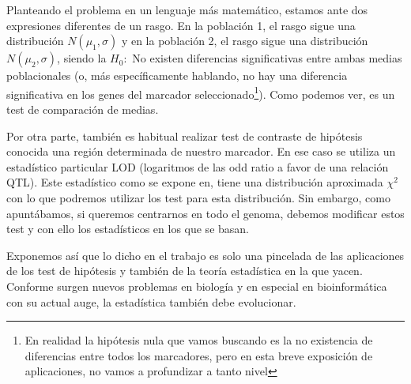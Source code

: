 \documentclass[a4paper,12pt]{article}
\begin{document}
Planteando el problema en un lenguaje más matemático, estamos ante dos expresiones diferentes de un rasgo. En la población 1, el rasgo sigue una distribución $N(\mu_1,\sigma)$ y en la población 2, el rasgo sigue una distribución $N(\mu_2,\sigma)$, siendo la $H_0:$ No existen diferencias significativas entre ambas medias poblacionales (o, más específicamente hablando, no hay una diferencia significativa en los genes del marcador seleccionado\footnote{En realidad la hipótesis nula que vamos buscando es la no existencia de diferencias entre todos los marcadores, pero en esta breve exposición de aplicaciones, no vamos a profundizar a tanto nivel}).
Como podemos ver, es un test de comparación de medias.

Por otra parte, también es habitual realizar test de contraste de hipótesis conocida una región determinada de nuestro marcador. En ese caso se utiliza un estadístico particular LOD (logaritmos de las odd ratio a favor de una relación QTL). Este estadístico como se expone en,\cite{uned2} tiene una distribución aproximada $\chi^2$
con lo que podremos utilizar los test para esta distribución.
Sin embargo, como apuntábamos, si queremos centrarnos en todo el genoma, debemos modificar estos test y con ello los estadísticos en los que se basan. 

Exponemos así que lo dicho en el trabajo es solo una pincelada de las aplicaciones de los test de hipótesis y también de la teoría estadística en la que yacen. Conforme surgen nuevos problemas en biología y en especial en bioinformática con su actual auge, la estadística también debe evolucionar.































\end{document}
